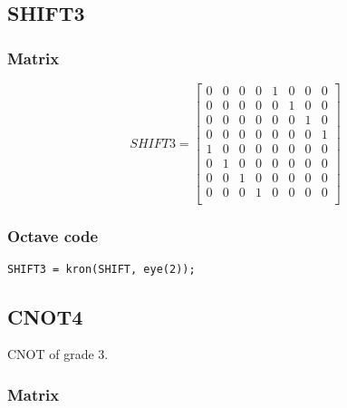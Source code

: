 \subsection{SHIFT3}

\subsubsection{Matrix}

\begin{equation*}
SHIFT3 =
\begin{bmatrix}
0 & 0 & 0 & 0 & 1 & 0 & 0 & 0\\
0 & 0 & 0 & 0 & 0 & 1 & 0 & 0\\
0 & 0 & 0 & 0 & 0 & 0 & 1 & 0\\
0 & 0 & 0 & 0 & 0 & 0 & 0 & 1\\
1 & 0 & 0 & 0 & 0 & 0 & 0 & 0\\
0 & 1 & 0 & 0 & 0 & 0 & 0 & 0\\
0 & 0 & 1 & 0 & 0 & 0 & 0 & 0\\
0 & 0 & 0 & 1 & 0 & 0 & 0 & 0\\
\end{bmatrix}
\end{equation*}

\subsubsection{Octave code}
\begin{lstlisting}
SHIFT3 = kron(SHIFT, eye(2));
\end{lstlisting}

\subsection{CNOT4}

CNOT of grade 3.

\subsubsection{Matrix}

